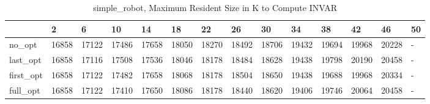 \begin{table}
\caption{simple_robot, Maximum Resident Size in K to Compute INVAR}
\label{simple_robot_INVAR_size}
\begin{tabular}{llllllllllllll}
\toprule
 & 2 & 6 & 10 & 14 & 18 & 22 & 26 & 30 & 34 & 38 & 42 & 46 & 50 \\
\midrule
no_opt & 16858 & 17122 & 17486 & 17658 & 18050 & 18270 & 18492 & 18706 & 19432 & 19694 & 19968 & 20228 & - \\
last_opt & 16858 & 17116 & 17508 & 17536 & 18046 & 18178 & 18484 & 18628 & 19438 & 19798 & 20190 & 20458 & - \\
first_opt & 16858 & 17122 & 17482 & 17658 & 18068 & 18178 & 18504 & 18650 & 19438 & 19688 & 19968 & 20334 & - \\
full_opt & 16858 & 17122 & 17410 & 17650 & 18086 & 18178 & 18440 & 18620 & 19406 & 19746 & 20064 & 20458 & - \\
\bottomrule
\end{tabular}
\end{table}
